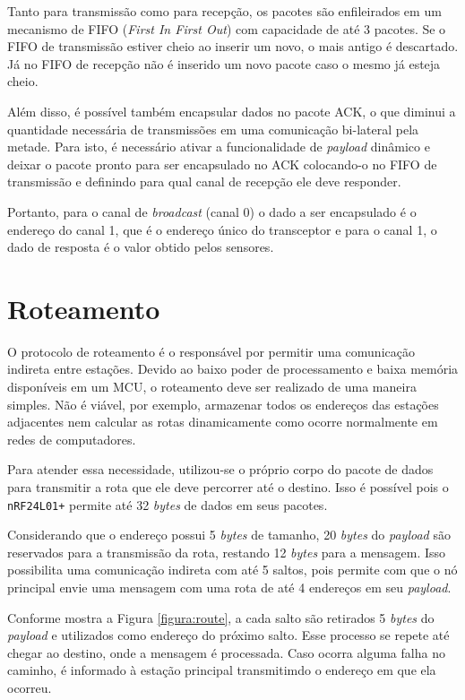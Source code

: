 {Tanto para transmissão como para recepção, os pacotes são enfileirados em um mecanismo de FIFO (\textit{First
In First Out}) com capacidade de até 3 pacotes. Se o FIFO de transmissão estiver cheio ao inserir um novo, o
mais antigo é descartado. Já no FIFO de recepção não é inserido um novo pacote caso o mesmo já esteja cheio.

Além disso, é possível também encapsular dados no pacote ACK, o que diminui a quantidade necessária de
transmissões em uma comunicação bi-lateral pela metade. Para isto, é necessário ativar a funcionalidade de
\textit{payload} dinâmico e deixar o pacote pronto para ser encapsulado no ACK colocando-o no FIFO de
transmissão e definindo para qual canal de recepção ele deve responder.

Portanto, para o canal de \textit{broadcast} (canal 0) o dado a ser encapsulado é o endereço do canal 1, que é o
endereço único do transceptor e para o canal 1, o dado de resposta é o valor obtido pelos sensores.

\section{Roteamento}
O protocolo de roteamento é o responsável por permitir uma comunicação indireta entre estações. Devido ao
baixo poder de processamento e baixa memória disponíveis em um MCU, o roteamento deve ser realizado de uma
maneira simples. Não é viável, por exemplo, armazenar todos os endereços das estações adjacentes nem
calcular as rotas dinamicamente como ocorre normalmente em redes de computadores.

Para atender essa necessidade, utilizou-se o próprio corpo do pacote de dados para transmitir a rota
que ele deve percorrer até o destino. Isso é possível pois o \texttt{nRF24L01+} permite até 32
\textit{bytes} de dados em seus pacotes.

Considerando que o endereço possui 5 \textit{bytes} de tamanho, 20 \textit{bytes} do \textit{payload} são
reservados para a transmissão da rota, restando 12 \textit{bytes} para a mensagem. Isso possibilita uma
comunicação indireta com até 5 saltos, pois permite com que o nó principal envie uma mensagem com uma rota de
até 4 endereços em seu \textit{payload}.

Conforme mostra a Figura \ref{figura:route}, a cada salto são retirados 5 \textit{bytes} do \textit{payload} e
utilizados como endereço do próximo salto.  Esse processo se repete até chegar ao destino, onde a mensagem é
processada. Caso ocorra alguma falha no caminho, é informado à estação principal transmitimdo o endereço em
que ela ocorreu.

}
